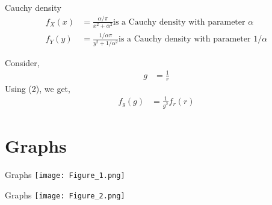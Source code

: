 \documentclass{beamer}
\begin{document}
\begin{frame}{Cauchy density}
    \begin{align}
        f_X(x) &= \frac{\alpha / \pi}{x^2 + \alpha^2} \text{is a Cauchy density with parameter $\alpha$}\\
        f_Y(y) &= \frac{1 /\alpha \pi}{y^2 + 1 / \alpha^2} \text{is a Cauchy density with parameter $1 / \alpha$}
    \end{align}
\end{frame}

\begin{frame}
    Consider,
    \begin{align}
        g &= \frac{1}{r}
    \end{align}
        Using (2), we get,
    \begin{align}
        f_g(g) &= \frac{1}{g^2}f_r(r)
    \end{align}
\end{frame}

\section{Graphs}
\begin{frame}{Graphs}
    \centering
    \texttt{[image: Figure\_1.png]}
\end{frame}

\begin{frame}{Graphs}
    \centering
    \texttt{[image: Figure\_2.png]}
\end{frame}
\end{document}
